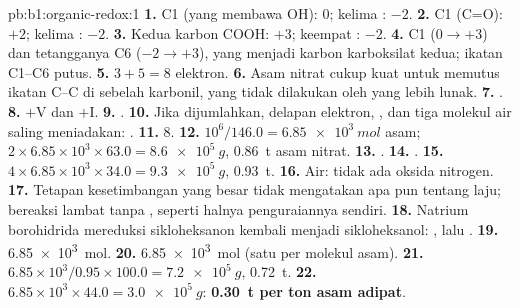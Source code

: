 \begin{solution}{pb:b1:organic-redox:1}
\textbf{1.} C1 (yang membawa OH): 0; kelima : $-2$.
\textbf{2.} C1 (C=O): $+2$; kelima : $-2$.
\textbf{3.} Kedua karbon COOH: $+3$; keempat : $-2$.
\textbf{4.} C1 ($0 \to +3$) dan tetangganya C6 ($-2 \to +3$), yang menjadi
karbon karboksilat kedua; ikatan C1--C6 putus.
\textbf{5.} $3 + 5 = 8$ elektron.
\textbf{6.} Asam nitrat cukup kuat untuk memutus ikatan C--C di sebelah
karbonil, yang tidak dilakukan oleh  yang lebih lunak.
\textbf{7.} .
\textbf{8.} $+$V dan $+$I.
\textbf{9.} .
\textbf{10.} Jika dijumlahkan, delapan elektron, , dan tiga
molekul air saling meniadakan:
.
\textbf{11.} 8.
\textbf{12.} $10^6/146.0 = \qty{6.85e3}{mol}$ asam; $2 \times 6.85 \times
10^3 \times 63.0 = \qty{8.6e5}{g}$, \qty{0.86}{t} asam nitrat.
\textbf{13.} .
\textbf{14.} .
\textbf{15.} $4 \times 6.85 \times 10^3 \times 34.0 = \qty{9.3e5}{g}$,
\qty{0.93}{t}.
\textbf{16.} Air: tidak ada oksida nitrogen.
\textbf{17.} Tetapan kesetimbangan yang besar tidak mengatakan apa pun
tentang laju;  bereaksi lambat tanpa , seperti halnya
penguraiannya sendiri.
\textbf{18.} Natrium borohidrida mereduksi sikloheksanon kembali menjadi
sikloheksanol: , lalu
.
\textbf{19.} \qty{6.85e3}{mol}.
\textbf{20.} \qty{6.85e3}{mol}  (satu per molekul asam).
\textbf{21.} $6.85 \times 10^3/0.95 \times 100.0 = \qty{7.2e5}{g}$, \qty{0.72}{t}.
\textbf{22.} $6.85 \times 10^3 \times 44.0 = \qty{3.0e5}{g}$: \textbf{\qty{0.30}{t}
 per ton asam adipat}.
\end{solution}
